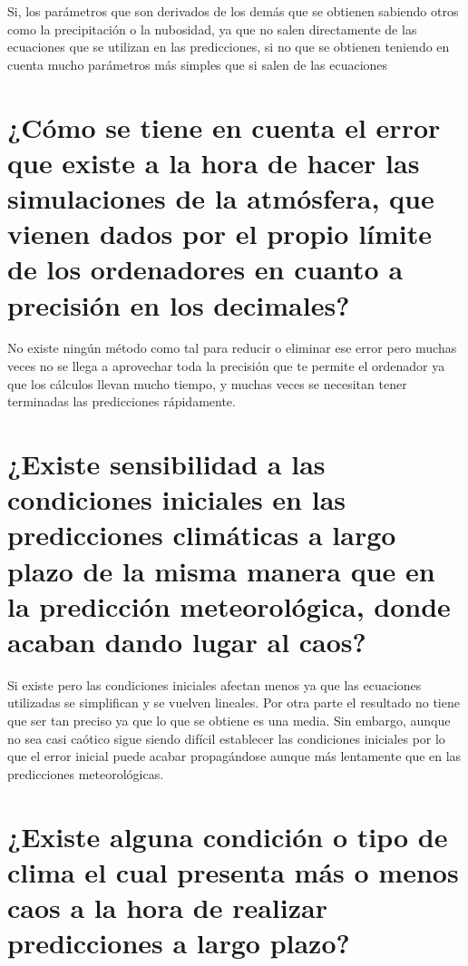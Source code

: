 \documentclass[
  10pt,
  a4paper,
  DIV=11,
  numbers=noendperiod,
  open=any]{scrreprt}
\numberwithin{equation}{chapter}
\numberwithin{equation}{section}
\renewcommand{\[}{\begin{equation}}
\renewcommand{\]}{\end{equation}}
\begin{document}
Si, los parámetros que son derivados de los demás que se obtienen
sabiendo otros como la precipitación o la nubosidad, ya que no salen
directamente de las ecuaciones que se utilizan en las predicciones, si
no que se obtienen teniendo en cuenta mucho parámetros más simples que
si salen de las ecuaciones

\section{¿Cómo se tiene en cuenta el error que existe a la hora de hacer
las simulaciones de la atmósfera, que vienen dados por el propio límite
de los ordenadores en cuanto a precisión en los
decimales?}\label{cuxf3mo-se-tiene-en-cuenta-el-error-que-existe-a-la-hora-de-hacer-las-simulaciones-de-la-atmuxf3sfera-que-vienen-dados-por-el-propio-luxedmite-de-los-ordenadores-en-cuanto-a-precisiuxf3n-en-los-decimales}

No existe ningún método como tal para reducir o eliminar ese error pero
muchas veces no se llega a aprovechar toda la precisión que te permite
el ordenador ya que los cálculos llevan mucho tiempo, y muchas veces se
necesitan tener terminadas las predicciones rápidamente.

\section{¿Existe sensibilidad a las condiciones iniciales en las
predicciones climáticas a largo plazo de la misma manera que en la
predicción meteorológica, donde acaban dando lugar al
caos?}\label{existe-sensibilidad-a-las-condiciones-iniciales-en-las-predicciones-climuxe1ticas-a-largo-plazo-de-la-misma-manera-que-en-la-predicciuxf3n-meteoroluxf3gica-donde-acaban-dando-lugar-al-caos}

Si existe pero las condiciones iniciales afectan menos ya que las
ecuaciones utilizadas se simplifican y se vuelven lineales. Por otra
parte el resultado no tiene que ser tan preciso ya que lo que se obtiene
es una media. Sin embargo, aunque no sea casi caótico sigue siendo
difícil establecer las condiciones iniciales por lo que el error inicial
puede acabar propagándose aunque más lentamente que en las predicciones
meteorológicas.

\section{¿Existe alguna condición o tipo de clima el cual presenta más o
menos caos a la hora de realizar predicciones a largo
plazo?}\label{existe-alguna-condiciuxf3n-o-tipo-de-clima-el-cual-presenta-muxe1s-o-menos-caos-a-la-hora-de-realizar-predicciones-a-largo-plazo}
\end{document}

